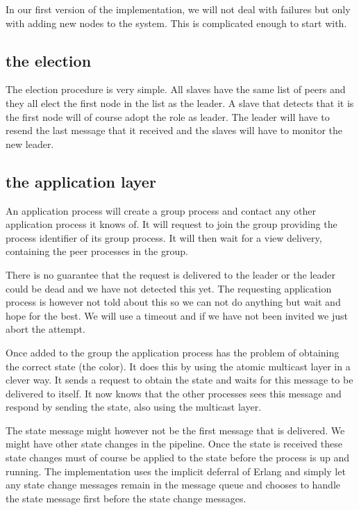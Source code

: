 \documentclass[a4paper,11pt]{article}
\begin{document}
In our first version of the implementation, we will not deal with
failures but only with adding new nodes to the system. This is complicated
enough to start with.

\subsection{the election}

The election procedure is very simple. All slaves have the same list
of peers and they all elect the first node in the list as the
leader. A slave that detects that it is the first node will of course
adopt the role as leader. The leader will have to resend the last
message that it received and the slaves will have to monitor the new
leader.

\subsection{the application layer}

An application process will create a group process and contact any
other application process it knows of. It will request to join the
group providing the process identifier of its group process. It will
then wait for a view delivery, containing the peer processes in the
group.

There is no guarantee that the request is delivered to the leader or the
leader could be dead and we have not detected this yet. The requesting
application process is however not told about this so we can not do
anything but wait and hope for the best. We will use a timeout and if
we have not been invited we just abort the attempt.

Once added to the group the application process has the problem of
obtaining the correct state (the color). It does this by using the
atomic multicast layer in a clever way. It sends a request to obtain
the state and waits for this message to be delivered to itself. It now
knows that the other processes sees this message and respond by
sending the state, also using the multicast layer. 

The state message might however not be the first message that is
delivered. We might have other state changes in the pipeline. Once the
state is received these state changes must of course be applied to the
state before the process is up and running. The implementation uses
the implicit deferral of Erlang and simply let any state change
messages remain in the message queue and chooses to handle the state
message first before the state change messages. 
\end{document}
